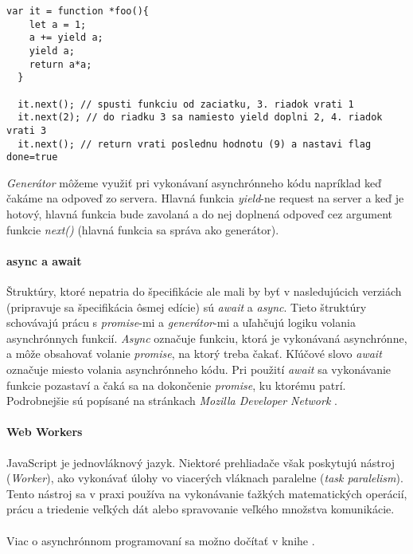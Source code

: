 \begin{lstlisting}[caption=Generátor, label={lst:generator}]
  var it = function *foo(){
    let a = 1;
    a += yield a;
    yield a;
    return a*a;
  }

  it.next(); // spusti funkciu od zaciatku, 3. riadok vrati 1
  it.next(2); // do riadku 3 sa namiesto yield doplni 2, 4. riadok vrati 3
  it.next(); // return vrati poslednu hodnotu (9) a nastavi flag done=true
\end{lstlisting}

\emph{Generátor} môžeme využiť pri vykonávaní asynchrónneho kódu napríklad keď čakáme na odpoveď zo servera. Hlavná funkcia \emph{yield}-ne request na server a keď je hotový, hlavná funkcia bude zavolaná a do nej doplnená odpoveď cez argument funkcie \emph{next()} (hlavná funkcia sa správa ako generátor).

\paragraph{async a await}
Štruktúry, ktoré nepatria do špecifikácie \JS{} ale mali by byť v nasledujúcich verziách (pripravuje sa špecifikácia ôsmej edície) sú \emph{await} a \emph{async}. 
Tieto štruktúry schovávajú prácu s \emph{promise}-mi a \emph{generátor}-mi a uľahčujú logiku volania asynchrónnych funkcií.
\emph{Async} označuje funkciu, ktorá je vykonávaná asynchrónne, a môže obsahovať volanie \emph{promise}, na ktorý treba čakať.
Kľúčové slovo \emph{await} označuje miesto volania asynchrónneho kódu. Pri použití \emph{await} sa vykonávanie funkcie pozastaví a čaká sa na dokončenie \emph{promise}, ku ktorému patrí.
Podrobnejšie sú popísané na stránkach \emph{Mozilla Developer Network} \cite{async, await}.

\paragraph{Web Workers}
JavaScript je jednovláknový jazyk. Niektoré prehliadače však poskytujú nástroj (\emph{Worker}), ako vykonávať úlohy vo viacerých vláknach paralelne (\emph{task paralelism}). Tento nástroj sa v praxi používa na vykonávanie ťažkých matematických operácií, prácu a triedenie veľkých dát alebo spravovanie veľkého množstva komunikácie.

\paragraph{}
Viac o asynchrónnom programovaní sa možno dočítať v knihe \cite[Async \& Performance]{youDontKnowJS5}.

